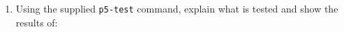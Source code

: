 \documentclass[11pt,letterpaper]{report}
\begin{document}
                                                                                                                                                                                                                                                                                                                                                                                                                                                                                                                        \begin{enumerate}
                                                                                                                                                                                                                                                                                                                                                                                                                                                                                                                            \item Using the supplied {\tt p5-test} command, explain what is tested and show the results of:
                                                                                                                                                                                                                                                                                                                                                                                                                                                                                                                                

\end{enumerate}
\end{document}
